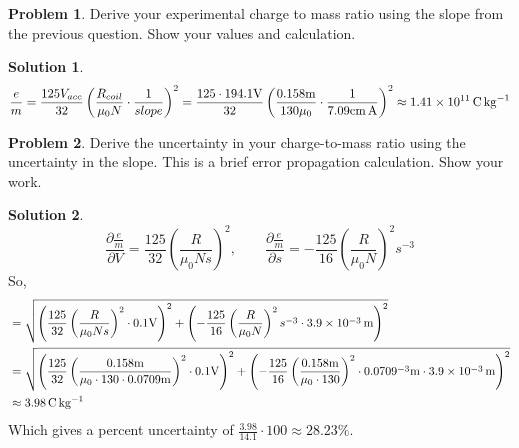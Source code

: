 \documentclass[10pt]{article}
\theoremstyle{definition}
\newtheorem{problem}{Problem}
\newtheorem{soln}{Solution}
\begin{document}
\begin{problem}
Derive your experimental charge to mass ratio using the slope from the previous question. Show your values and calculation.
\end{problem}
\begin{soln}
  $$\frac{e}{m}=\frac{125V_{acc}}{32}\left(\frac{R_{coil}}{\mu_0N}\cdot\frac{1}{slope}\right)^2=\frac{125\cdot194.1\unit{\volt}}{32}\left(\frac{0.158\unit{\meter}}{130\mu_0}\cdot\frac{1}{7.09\unit{\centi\meter\ampere}}\right)^2\approx\qty{1.41d11}{\coulomb\per\kilo\gram}$$
\end{soln}

\begin{problem}
Derive the uncertainty in your charge-to-mass ratio using the uncertainty in the slope. This is a brief error propagation calculation. Show your work.
\end{problem}
\begin{soln}
  $$\frac{\partial \frac{e}{m}}{\partial V}=\frac{125}{32}\left(\frac{R}{\mu_0Ns}\right)^2,\qquad \frac{\partial \frac{e}{m}}{\partial s}=-\frac{125}{16}\left(\frac{R}{\mu_0N}\right)^2s^{-3}$$
  So,
  \begin{align*}
     & =\sqrt{\left(\frac{125}{32}\left(\frac{R}{\mu_0Ns}\right)^2\cdot 0.1\unit{\volt}\right)^2+\left(-\frac{125}{16}\left(\frac{R}{\mu_0N}\right)^2s^{-3}\cdot\qty{3.9d-3}{\meter}\right)^2}                                                                                               \\
     & =\sqrt{\left(\frac{125}{32}\left(\frac{0.158\unit{\meter}}{\mu_0\cdot130\cdot0.0709\unit{\meter}}\right)^2\cdot 0.1\unit{\volt}\right)^2+\left(-\frac{125}{16}\left(\frac{0.158\unit{\meter}}{\mu_0\cdot130}\right)^2\cdot0.0709^{-3}\unit{\meter}\cdot\qty{3.9d-3}{\meter}\right)^2} \\
     & \approx\qty{3.98}{\coulomb\per\kilo\gram}
  \end{align*}
  Which gives a percent uncertainty of $\displaystyle\frac{3.98}{14.1}\cdot100\approx28.23\%$.
\end{soln}
\newpage
\end{document}
